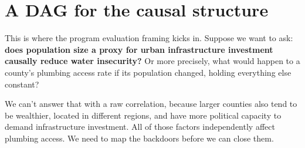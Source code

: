 \documentclass[
]{article}
\begin{document}
\section{A DAG for the causal
structure}\label{a-dag-for-the-causal-structure}

This is where the program evaluation framing kicks in. Suppose we want
to ask: \textbf{does population size a proxy for urban infrastructure
investment causally reduce water insecurity?} Or more precisely, what
would happen to a county's plumbing access rate if its population
changed, holding everything else constant?

We can't answer that with a raw correlation, because larger counties
also tend to be wealthier, located in different regions, and have more
political capacity to demand infrastructure investment. All of those
factors independently affect plumbing access. We need to map the
backdoors before we can close them.
\end{document}
